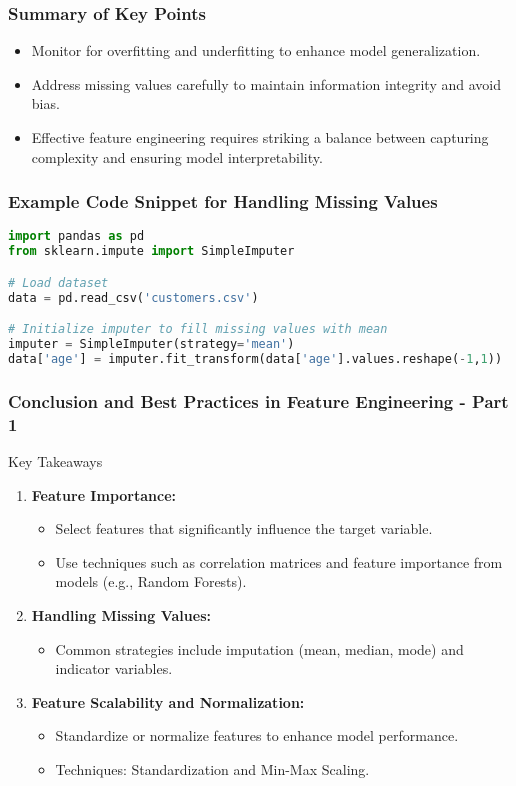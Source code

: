 \documentclass[aspectratio=169]{beamer}
\begin{document}
\begin{frame}[fragile]
    \frametitle{Summary of Key Points}
    \begin{itemize}
        \item Monitor for overfitting and underfitting to enhance model generalization.
        \item Address missing values carefully to maintain information integrity and avoid bias.
        \item Effective feature engineering requires striking a balance between capturing complexity and ensuring model interpretability.
    \end{itemize}
\end{frame}

\begin{frame}[fragile]
    \frametitle{Example Code Snippet for Handling Missing Values}
    \begin{lstlisting}[language=Python]
import pandas as pd
from sklearn.impute import SimpleImputer

# Load dataset
data = pd.read_csv('customers.csv')

# Initialize imputer to fill missing values with mean
imputer = SimpleImputer(strategy='mean')
data['age'] = imputer.fit_transform(data['age'].values.reshape(-1,1))
    \end{lstlisting}
\end{frame}

\begin{frame}[fragile]
  \frametitle{Conclusion and Best Practices in Feature Engineering - Part 1}
  
  \begin{block}{Key Takeaways}
    \begin{enumerate}
      \item \textbf{Feature Importance:}
        \begin{itemize}
          \item Select features that significantly influence the target variable.
          \item Use techniques such as correlation matrices and feature importance from models (e.g., Random Forests).
        \end{itemize}
      
      \item \textbf{Handling Missing Values:}
        \begin{itemize}
          \item Common strategies include imputation (mean, median, mode) and indicator variables.
        \end{itemize}
      
      \item \textbf{Feature Scalability and Normalization:}
        \begin{itemize}
          \item Standardize or normalize features to enhance model performance.
          \item Techniques: Standardization and Min-Max Scaling.
        \end{itemize}
    \end{enumerate}
  \end{block}
\end{frame}
\end{document}
